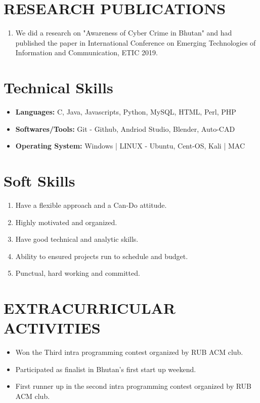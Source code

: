 \documentclass[10pt]{article}
\begin{document}
	\section{RESEARCH PUBLICATIONS}
	\begin{enumerate}
		\item We did a research on "Awareness of Cyber Crime in Bhutan" and had published the paper in International Conference on Emerging Technologies of Information and Communication, ETIC 2019.
	\end{enumerate}

	\section{Technical Skills}
	\begin{itemize}
		\item {\bf Languages: } C, Java, Javascripts, Python, MySQL,  HTML, Perl, PHP
		\item  {\bf Softwares/Tools: } Git - Github, Andriod Studio, Blender, Auto-CAD
		\item  {\bf Operating System: } Windows | LINUX - Ubuntu, Cent-OS, Kali | MAC
	\end{itemize}

	\section{Soft Skills}
	\begin{enumerate}
		\item  {Have a flexible approach and a Can-Do attitude. }
		\item  {Highly motivated and organized. }
		\item  {Have good technical and analytic skills. }
		\item  {Ability to ensured projects run to schedule and budget.}
		\item  {Punctual, hard working and committed.}
	\end{enumerate}

	\section{EXTRACURRICULAR ACTIVITIES}
	\begin{itemize}
		\item {Won the Third intra programming contest organized by RUB ACM club. }
		\item  {Participated as finalist in Bhutan’s first start up weekend. }
		\item  {First runner up in the second intra programming contest organized by RUB ACM club. }
	\end{itemize}
\end{document}
